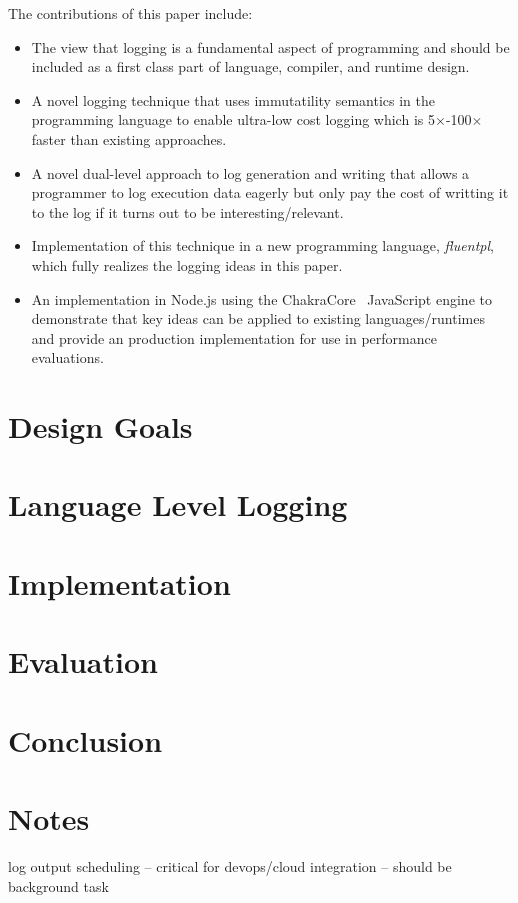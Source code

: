 \documentclass[preprint]{sig-alternate-05-2015}
\begin{document}
\noindent
The contributions of this paper include:
\begin{itemize}
\item The view that logging is a fundamental aspect of programming and should be
included as a first class part of language, compiler, and runtime design.

\item A novel logging technique that uses immutatility semantics in the
programming language to enable ultra-low cost logging which is
5$\times$-100$\times$ faster than existing approaches.

\item A novel dual-level approach to log generation and writing that allows a
programmer to log execution data eagerly but only pay the cost of writting it to
the log if it turns out to be interesting/relevant.

\item Implementation of this technique in a new programming language,
\emph{fluentpl}, which fully realizes the logging ideas in this paper. 

\item An implementation in Node.js using the ChakraCore~\cite{NodeChakraCore}
JavaScript engine to demonstrate that key ideas can be applied to existing
languages/runtimes and provide an production implementation for use in
performance evaluations.
\end{itemize}

\section{Design Goals}
\label{sec:design}


\section{Language Level Logging}

\section{Implementation}

\section{Evaluation}

\section{Conclusion}

\section{Notes} log output scheduling -- critical for devops/cloud integration
-- should be background task


\balance

{
\raggedright 


 
}
\end{document}

